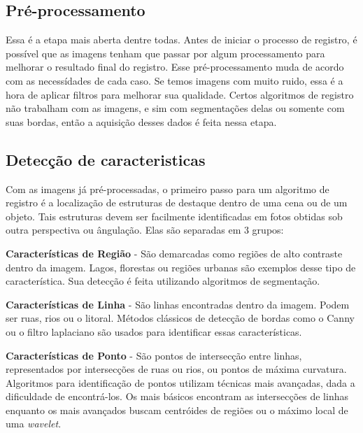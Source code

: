 \subsection{Pré-processamento}
    Essa é a etapa mais aberta dentre todas. Antes de iniciar o processo de registro, é possível que as imagens tenham
que passar por algum processamento para melhorar o resultado final do registro. Esse pré-processamento muda de acordo
com as necessídades de cada caso. Se temos imagens com muito ruido, essa é a hora de aplicar filtros para melhorar sua 
qualidade. Certos algoritmos de registro não trabalham com as imagens, e sim com segmentações delas ou somente com suas
bordas, então a aquisição desses dados é feita nessa etapa.

\subsection{Detecção de caracteristicas}
\label{sec:dec_corr_carac}

    Com as imagens já pré-processadas, o primeiro passo para um algoritmo de registro é a localização de estruturas de 
destaque dentro de uma cena ou de um objeto. Tais estruturas devem ser facilmente identificadas em fotos obtidas sob 
outra perspectiva ou ângulação. Elas são separadas em 3 grupos:

\textbf{Características de Região} - São demarcadas como regiões de alto contraste dentro da imagem. Lagos, florestas ou
regiões urbanas são exemplos desse tipo de característica. Sua detecção é feita utilizando algoritmos de segmentação.

\textbf{Características de Linha} - São linhas encontradas dentro da imagem. Podem ser ruas, rios ou o litoral. Métodos
clássicos de detecção de bordas como o Canny ou o filtro laplaciano são usados para identificar essas características.

\textbf{Características de Ponto} - São pontos de intersecção entre linhas, representados por intersecções de ruas ou
rios, ou pontos de máxima curvatura. Algoritmos para identificação de pontos utilizam técnicas mais avançadas, dada a 
dificuldade de encontrá-los. Os mais básicos encontram as intersecções de linhas enquanto os mais avançados buscam
centróides de regiões ou o máximo local de uma \textit{wavelet}.

